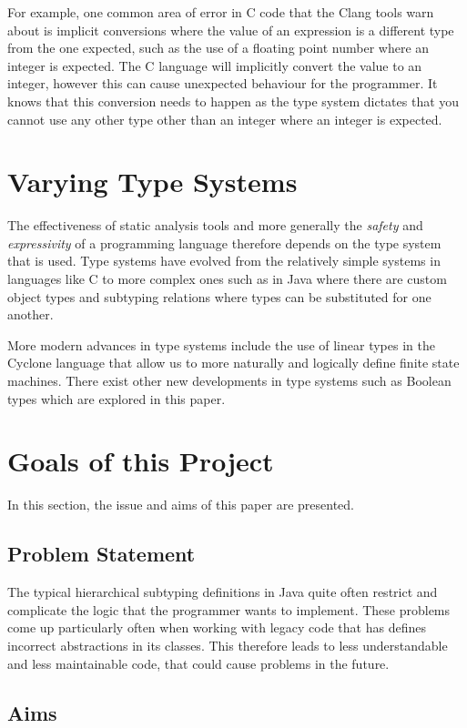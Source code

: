 \documentclass{l4proj}
\begin{document}
For example, one common area of error in C code that the Clang tools warn about is implicit conversions where the value of an expression is a different type from the one expected, such as the use of a floating point number where an integer is expected.
The C language will implicitly convert the value to an integer, however this can cause unexpected behaviour for the programmer.
It knows that this conversion needs to happen as the type system dictates that you cannot use any other type other than an integer where an integer is expected.

\section{Varying Type Systems}

The effectiveness of static analysis tools and more generally the \emph{safety} and \emph{expressivity} of a programming language therefore depends on the type system that is used.
Type systems have evolved from the relatively simple systems in languages like C to more complex ones such as in Java where there are custom object types and subtyping relations where types can be substituted for one another.

More modern advances in type systems include the use of linear types in the Cyclone \citep{grossman2002} language that allow us to more naturally and logically define finite state machines.
There exist other new developments in type systems such as Boolean types which are explored in this paper.

\section{Goals of this Project}

In this section, the issue and aims of this paper are presented.

\subsection{Problem Statement}

The typical hierarchical subtyping definitions in Java quite often restrict and complicate the logic that the programmer wants to implement. These problems come up particularly often when working with legacy code that has defines incorrect abstractions in its classes. This therefore leads to less understandable and less maintainable code, that could cause problems in the future.

\subsection{Aims}
\end{document}
